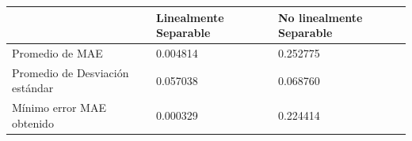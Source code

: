 \begin{tabular}{lll}
\toprule
  & Linealmente Separable & No linealmente Separable \\
\midrule
Promedio de MAE & 0.004814 & 0.252775 \\
Promedio de Desviación estándar & 0.057038 & 0.068760 \\
Mínimo error MAE obtenido & 0.000329 & 0.224414 \\
\bottomrule
\end{tabular}
